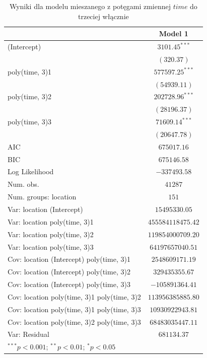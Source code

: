 \documentclass[12pt]{mwbk}
\theoremstyle{plain}
\theoremstyle{definition}
\theoremstyle{remark}
\begin{document}
\begin{table}
	\begin{center}
		\begin{tabular}{l c}
			\hline
			& Model 1 \\
			\hline
			(Intercept)                                 & $3101.45^{***}$   \\
			& $(320.37)$        \\
			poly(time, 3)1                              & $577597.25^{***}$ \\
			& $(54939.11)$      \\
			poly(time, 3)2                              & $202728.96^{***}$ \\
			& $(28196.37)$      \\
			poly(time, 3)3                              & $71609.14^{***}$  \\
			& $(20647.78)$      \\
			\hline
			AIC                                         & $675017.16$       \\
			BIC                                         & $675146.58$       \\
			Log Likelihood                              & $-337493.58$      \\
			Num. obs.                                   & $41287$           \\
			Num. groups: location                       & $151$             \\
			Var: location (Intercept)                   & $15495330.05$     \\
			Var: location poly(time, 3)1                & $455584118475.42$ \\
			Var: location poly(time, 3)2                & $119854000709.20$ \\
			Var: location poly(time, 3)3                & $64197657040.51$  \\
			Cov: location (Intercept) poly(time, 3)1    & $2548609171.19$   \\
			Cov: location (Intercept) poly(time, 3)2    & $329435355.67$    \\
			Cov: location (Intercept) poly(time, 3)3    & $-105891364.41$   \\
			Cov: location poly(time, 3)1 poly(time, 3)2 & $113956385885.80$ \\
			Cov: location poly(time, 3)1 poly(time, 3)3 & $10930922943.81$  \\
			Cov: location poly(time, 3)2 poly(time, 3)3 & $68483035447.11$  \\
			Var: Residual                               & $681134.37$       \\
			\hline
			\multicolumn{2}{l}{\scriptsize{$^{***}p<0.001$; $^{**}p<0.01$; $^{*}p<0.05$}}
		\end{tabular}
		\caption{Wyniki dla modelu mieszanego z potęgami zmiennej $time$ do trzeciej włącznie}
		\label{table:mod1-poly}
	\end{center}
\end{table}
\end{document}
